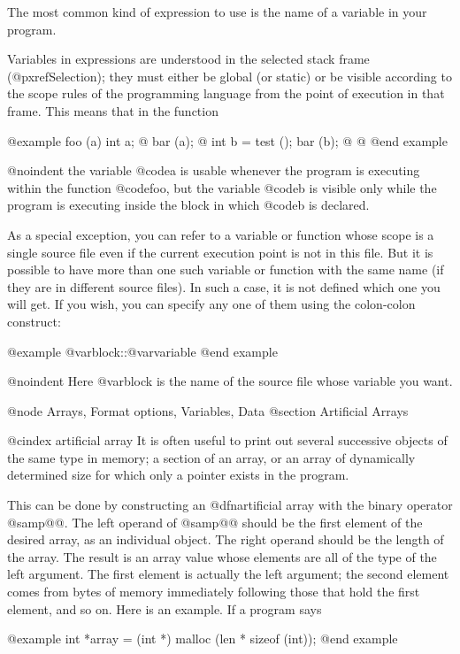 The most common kind of expression to use is the name of a variable
in your program.

Variables in expressions are understood in the selected stack frame
(@pxref{Selection}); they must either be global (or static) or be visible
according to the scope rules of the programming language from the point of
execution in that frame.  This means that in the function

@example
foo (a)
     int a;
@{
  bar (a);
  @{
    int b = test ();
    bar (b);
  @}
@}
@end example

@noindent
the variable @code{a} is usable whenever the program is executing
within the function @code{foo}, but the variable @code{b} is visible
only while the program is executing inside the block in which @code{b}
is declared.

As a special exception, you can refer to a variable or function whose
scope is a single source file even if the current execution point is not
in this file.  But it is possible to have more than one such variable
or function with the same name (if they are in different source files).
In such a case, it is not defined which one you will get.  If you wish,
you can specify any one of them using the colon-colon construct:

@example
@var{block}::@var{variable}
@end example

@noindent
Here @var{block} is the name of the source file whose variable you want.

@node Arrays, Format options, Variables, Data
@section Artificial Arrays

@cindex artificial array
It is often useful to print out several successive objects of the
same type in memory; a section of an array, or an array of
dynamically determined size for which only a pointer exists in the
program.

This can be done by constructing an @dfn{artificial array} with the
binary operator @samp{@@}.  The left operand of @samp{@@} should be
the first element of the desired array, as an individual object.
The right operand should be the length of the array.  The result is
an array value whose elements are all of the type of the left argument.
The first element is actually the left argument; the second element
comes from bytes of memory immediately following those that hold the
first element, and so on.  Here is an example.  If a program says

@example
int *array = (int *) malloc (len * sizeof (int));
@end example

